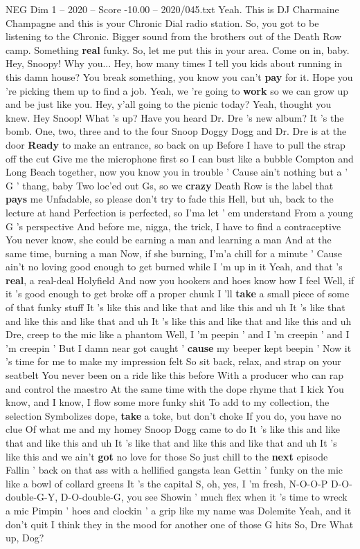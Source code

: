 \begin{textsample}{NEG Dim 1 – 2020 – Score -10.00 – 2020/045.txt}  \label{ex:f1_neg_031}
Yeah.
This is DJ Charmaine Champagne and this is your Chronic Dial radio station.
So, you got to be listening to the Chronic.
Bigger sound from the brothers out of the Death Row camp.
Something \textbf{real} funky.
So, let me put this in your area.
Come on in, baby.
Hey, Snoopy!
Why you...
Hey, how many times I tell you kids about running in this damn house?
You break something, you know you can't \textbf{pay} for it.
Hope you 're picking them up to find a job.
Yeah, we 're going to \textbf{work} so we can grow up and be just like you.
Hey, y'all going to the picnic today?
Yeah, thought you knew.
Hey Snoop!
What 's up?
Have you heard Dr.
Dre 's new album?
It 's the bomb.
One, two, three and to the four Snoop Doggy Dogg and Dr.
Dre is at the door \textbf{Ready} to make an entrance, so back on up Before I have to pull the strap off the cut Give me the microphone first so I can bust like a bubble Compton and Long Beach together, now you know you in trouble ' Cause ain't nothing but a ' G ' thang, baby Two loc'ed out Gs, so we \textbf{crazy} Death Row is the label that \textbf{pays} me Unfadable, so please don't try to fade this Hell, but uh, back to the lecture at hand Perfection is perfected, so I'ma let ' em understand From a young G 's perspective And before me, nigga, the trick, I have to find a contraceptive You never know, she could be earning a man and learning a man And at the same time, burning a man Now, if she burning, I'm'a chill for a minute ' Cause ain't no loving good enough to get burned while I 'm up in it Yeah, and that 's \textbf{real}, a real-deal Holyfield And now you hookers and hoes know how I feel Well, if it 's good enough to get broke off a proper chunk I 'll \textbf{take} a small piece of some of that funky stuff It 's like this and like that and like this and uh It 's like that and like this and like that and uh It 's like this and like that and like this and uh Dre, creep to the mic like a phantom Well, I 'm peepin ' and I 'm creepin ' and I 'm creepin ' But I damn near got caught ' \textbf{cause} my beeper kept beepin ' Now it 's time for me to make my impression felt So sit back, relax, and strap on your seatbelt You never been on a ride like this before With a producer who can rap and control the maestro At the same time with the dope rhyme that I kick You know, and I know, I flow some more funky shit To add to my collection, the selection Symbolizes dope, \textbf{take} a toke, but don't choke If you do, you have no clue Of what me and my homey Snoop Dogg came to do It 's like this and like that and like this and uh It 's like that and like this and like that and uh It 's like this and we ain't \textbf{got} no love for those So just chill to the \textbf{next} episode Fallin ' back on that ass with a hellified gangsta lean Gettin ' funky on the mic like a bowl of collard greens It 's the capital S, oh, yes, I 'm fresh, N-O-O-P D-O-double-G-Y, D-O-double-G, you see Showin ' much flex when it 's time to wreck a mic Pimpin ' hoes and clockin ' a grip like my name was Dolemite Yeah, and it don't quit I think they in the mood for another one of those G hits So, Dre What up, Dog?

\end{textsample}
